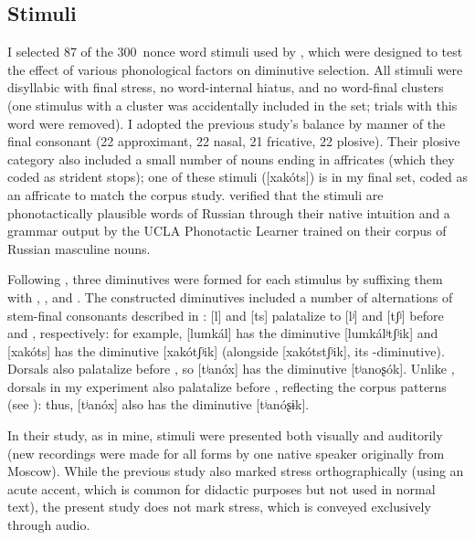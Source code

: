 \documentclass[output=paper,colorlinks,citecolor=brown
]{langscibook}
\begin{document}
\subsection{Stimuli}\label{sec:expstim}
I selected 87 of the 300~nonce word stimuli used by \citet{Gouskova.etal2015}, which were designed to test the effect of various phonological factors on diminutive selection. All stimuli were disyllabic with final stress, no word-internal hiatus, and no word-final clusters (one stimulus with a cluster was accidentally included in the set; trials with this word were removed). I adopted the previous study's balance by manner of the final consonant (22 approximant, 22 nasal, 21 fricative, 22 plosive). Their plosive category also included a small number of nouns ending in affricates (which they coded as strident stops); one of these stimuli ([xakóts]) is in my final set, coded as an affricate to match the corpus study. \citet{Gouskova.etal2015} verified that the stimuli are phonotactically plausible words of Russian through their native intuition and a grammar output by the UCLA Phonotactic Learner \citet{Hayes.Wilson2008} trained on their corpus of Russian masculine nouns.

Following \citet{Gouskova.etal2015}, three diminutives were formed for each stimulus by suffixing them with \ok{}, \ik{}, and \chik{}. The constructed diminutives included a number of alternations of stem-final consonants described in : [l] and [ts] palatalize to [lʲ] and [tʃʲ] before \chik{} and \ok{}, respectively: for example, [lumkál] has the diminutive [lumkálʲtʃʲik] and [xakóts] has the diminutive [xakótʃʲik] (alongside [xakótstʃʲik], its \chik-diminutive). Dorsals also palatalize before \ok{}, so [tʲanóx] has the diminutive [tʲanoʂók]. Unlike \citet{Gouskova.etal2015}, dorsals in my experiment also palatalize before \ik{}, reflecting the corpus patterns (see ): thus, [tʲanóx] also has the diminutive [tʲanóʂɨk].

In their study, as in mine, stimuli were presented both visually and auditorily (new recordings were made for all forms by one native speaker originally from Moscow). %
While the previous study also marked stress orthographically (using an acute accent, which is common for didactic purposes but not used in normal text), the present study does not mark stress, which is conveyed exclusively through audio.
\end{document}
